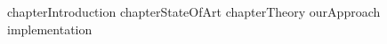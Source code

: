 \documentclass[12pt,a4paper]{report}
\author{HUYNH Le Duy}
\begin{document}
\tableofcontents
\listoffigures
{chapterIntroduction}
{chapterStateOfArt}
{chapterTheory}
{ourApproach}
{implementation}


\end{document}
